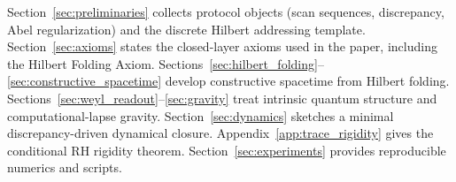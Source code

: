 Section~\ref{sec:preliminaries} collects protocol objects (scan sequences, discrepancy, Abel regularization) and the discrete Hilbert addressing template.
Section~\ref{sec:axioms} states the closed-layer axioms used in the paper, including the Hilbert Folding Axiom.
Sections~\ref{sec:hilbert_folding}--\ref{sec:constructive_spacetime} develop constructive spacetime from Hilbert folding.
Sections~\ref{sec:weyl_readout}--\ref{sec:gravity} treat intrinsic quantum structure and computational-lapse gravity.
Section~\ref{sec:dynamics} sketches a minimal discrepancy-driven dynamical closure.
Appendix~\ref{app:trace_rigidity} gives the conditional RH rigidity theorem.
Section~\ref{sec:experiments} provides reproducible numerics and scripts.


